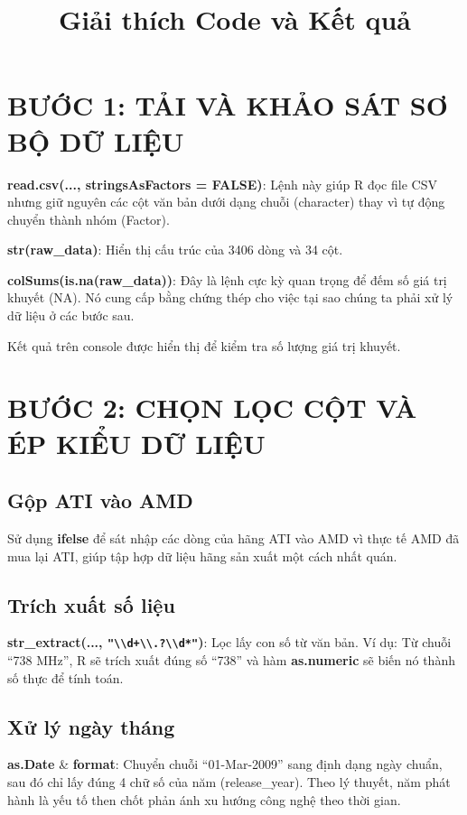 \documentclass[12pt,a4paper]{article}
\title{Giải thích Code và Kết quả}
\author{}
\date{}
\begin{document}
\maketitle

\section{BƯỚC 1: TẢI VÀ KHẢO SÁT SƠ BỘ DỮ LIỆU}

\textbf{read.csv(..., stringsAsFactors = FALSE)}: Lệnh này giúp R đọc file CSV nhưng giữ nguyên các cột văn bản dưới dạng chuỗi (character) thay vì tự động chuyển thành nhóm (Factor).

\textbf{str(raw\_data)}: Hiển thị cấu trúc của 3406 dòng và 34 cột.

\textbf{colSums(is.na(raw\_data))}: Đây là lệnh cực kỳ quan trọng để đếm số giá trị khuyết (NA). Nó cung cấp bằng chứng thép cho việc tại sao chúng ta phải xử lý dữ liệu ở các bước sau.

Kết quả trên console được hiển thị để kiểm tra số lượng giá trị khuyết.

\section{BƯỚC 2: CHỌN LỌC CỘT VÀ ÉP KIỂU DỮ LIỆU}

\subsection{Gộp ATI vào AMD}
Sử dụng \textbf{ifelse} để sát nhập các dòng của hãng ATI vào AMD vì thực tế AMD đã mua lại ATI, giúp tập hợp dữ liệu hãng sản xuất một cách nhất quán.

\subsection{Trích xuất số liệu}
\textbf{str\_extract(..., \texttt{"\textbackslash\textbackslash d+\textbackslash\textbackslash.?\textbackslash\textbackslash d*"})}: Lọc lấy con số từ văn bản. Ví dụ: Từ chuỗi ``738 MHz'', R sẽ trích xuất đúng số ``738'' và hàm \textbf{as.numeric} sẽ biến nó thành số thực để tính toán.

\subsection{Xử lý ngày tháng}
\textbf{as.Date} \& \textbf{format}: Chuyển chuỗi ``01-Mar-2009'' sang định dạng ngày chuẩn, sau đó chỉ lấy đúng 4 chữ số của năm (release\_year). Theo lý thuyết, năm phát hành là yếu tố then chốt phản ánh xu hướng công nghệ theo thời gian.
\end{document}
